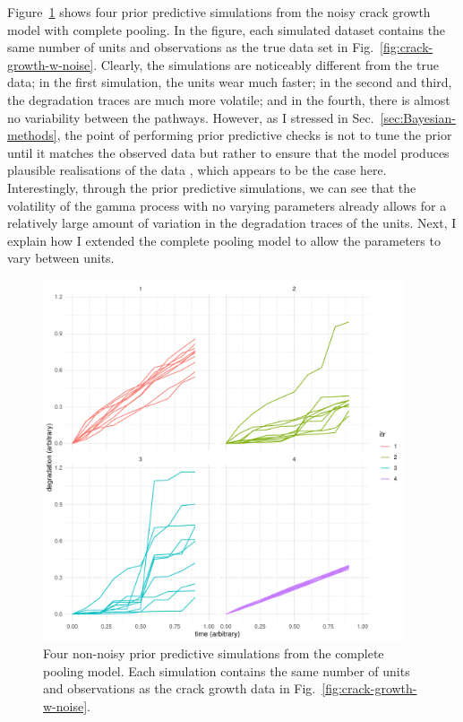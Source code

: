 Figure~\ref{fig:ppc-multi-unit} shows four prior predictive simulations from the noisy crack growth model with complete pooling. In the figure, each simulated dataset contains the same number of units and observations as the true data set in Fig.~\ref{fig:crack-growth-w-noise}. Clearly, the simulations are noticeably different from the true data; in the first simulation, the units wear much faster; in the second and third, the degradation traces are much more volatile; and in the fourth, there is almost no variability between the pathways. However, as I stressed in Sec.~\ref{sec:Bayesian-methods}, the point of performing prior predictive checks is not to tune the prior until it matches the observed data but rather to ensure that the model produces plausible realisations of the data \citep{gabry_vis_2019}, which appears to be the case here. Interestingly, through the prior predictive simulations, we can see that the volatility of the gamma process with no varying parameters already allows for a relatively large amount of variation in the degradation traces of the units. Next, I explain how I extended the complete pooling model to allow the parameters to vary between units.

\begin{figure}[tbp]
   \centering
   \includegraphics[width=0.95\textwidth]{./figures/ch-5/PPC_multi_unit.pdf}
   \caption{Four non-noisy prior predictive simulations from the complete pooling model. Each simulation contains the same number of units and observations as the crack growth data in Fig.~\ref{fig:crack-growth-w-noise}.}
   \label{fig:ppc-multi-unit} 
\end{figure}

